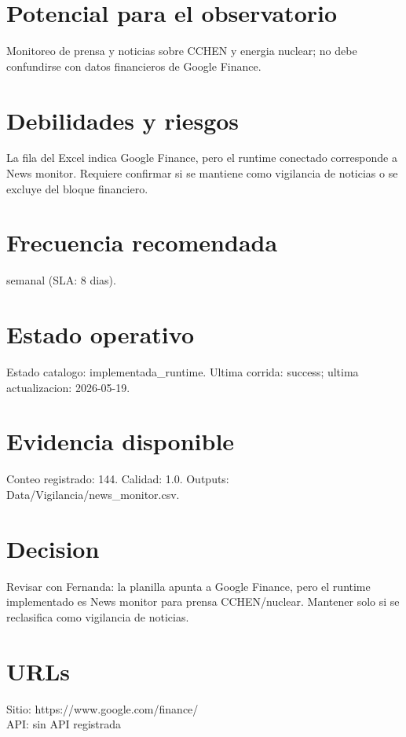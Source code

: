 \documentclass[10pt,a4paper]{article}
\begin{document}
\section*{Potencial para el observatorio}
Monitoreo de prensa y noticias sobre CCHEN y energia nuclear; no debe confundirse con datos financieros de Google Finance.

\section*{Debilidades y riesgos}
La fila del Excel indica Google Finance, pero el runtime conectado corresponde a News monitor. Requiere confirmar si se mantiene como vigilancia de noticias o se excluye del bloque financiero.

\section*{Frecuencia recomendada}
semanal (SLA: 8 dias).

\section*{Estado operativo}
Estado catalogo: implementada\_runtime. Ultima corrida: success; ultima actualizacion: 2026-05-19.

\section*{Evidencia disponible}
Conteo registrado: 144. Calidad: 1.0. Outputs: Data/Vigilancia/news\_monitor.csv.

\section*{Decision}
Revisar con Fernanda: la planilla apunta a Google Finance, pero el runtime implementado es News monitor para prensa CCHEN/nuclear. Mantener solo si se reclasifica como vigilancia de noticias.


\section*{URLs}
Sitio: https://www.google.com/finance/\\
API: sin API registrada
\end{document}
